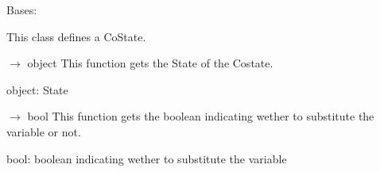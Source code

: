 \documentclass[letterpaper,10pt,english]{sphinxmanual}
\begin{document}
\begin{fulllineitems}
\label{\detokenize{scrimp:scrimp.costate.CoState}}
\pysigstartsignatures
\pysiglinewithargsret
{}
{\sphinxparamcomma {}\sphinxparamcomma {}\sphinxparamcomma {}}
{}
\pysigstopsignatures
\sphinxAtStartPar
Bases: {\hyperref[\detokenize{scrimp:scrimp.state.State}]{}}

\sphinxAtStartPar
This class defines a Co\sphinxhyphen{}State.

\begin{fulllineitems}
\label{\detokenize{scrimp:scrimp.costate.CoState.get_state}}
\pysigstartsignatures
\pysiglinewithargsret
{}
{}
{{ $\rightarrow$ object}}
\pysigstopsignatures
\sphinxAtStartPar
This function gets the State of the Costate.
\begin{description}
\sphinxAtStartPar
object: State

\end{description}

\end{fulllineitems}


\begin{fulllineitems}
\label{\detokenize{scrimp:scrimp.costate.CoState.get_substituted}}
\pysigstartsignatures
\pysiglinewithargsret
{}
{}
{{ $\rightarrow$ bool}}
\pysigstopsignatures
\sphinxAtStartPar
This function gets the boolean indicating wether to substitute the variable or not.
\begin{description}
\sphinxAtStartPar
bool: boolean indicating wether to substitute the variable

\end{description}

\end{fulllineitems}


\end{fulllineitems}
\end{document}
